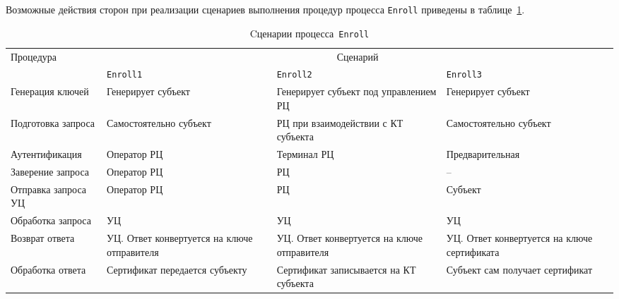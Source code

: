 Возможные действия сторон при реализации сценариев выполнения процедур 
процесса \texttt{Enroll} приведены в таблице~\ref{Table.ENROLL.Summary}.

\begin{table}[bht]
\caption{Cценарии процесса~\texttt{Enroll}} 
\label{Table.ENROLL.Summary}
\begin{tabular}{|p{3.2cm}|p{4cm}|p{4cm}|p{4cm}|}
\hline
Процедура & \multicolumn{3}{|c|}{Сценарий}\\
\cline{2-4}
&\texttt{Enroll1}&\texttt{Enroll2}&\texttt{Enroll3}\\
\hline
\hline
Генерация ключей & 
Генерирует субъект & 
Генерирует субъект под управлением РЦ &
Генерирует субъект\\
\hline
%
Подготовка запроса & 
Самостоятельно субъект & 
РЦ при взаимодействии с КТ субъекта &
Самостоятельно субъект\\
\hline
%
Аутентификация & 
Оператор РЦ &
Терминал РЦ & 
Предварительная\\
\hline
%
Заверение запроса & 
Оператор РЦ &
РЦ & 
--\\
\hline
%
Отправка запроса УЦ & 
Оператор РЦ &
РЦ & 
Субъект\\
\hline
%
Обработка запроса & 
УЦ &
УЦ & 
УЦ\\
\hline
%
Возврат ответа & 
УЦ. Ответ конвертуется на ключе отправителя &
УЦ. Ответ конвертуется на ключе отправителя &
УЦ. Ответ конвертуется на ключе сертификата\\
\hline
%
Обработка ответа & 
Сертификат передается субъекту &
Сертификат записывается на КТ субъекта &
Субъект сам получает сертификат\\
\hline
\end{tabular}
\end{table}

